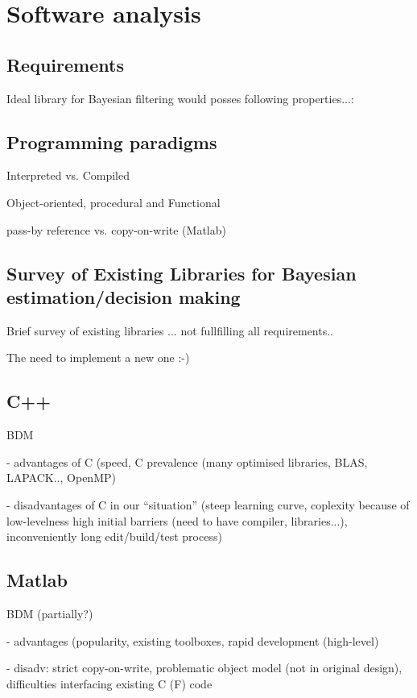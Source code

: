 \documentclass[a4paper,12pt,oneside]{report}
\begin{document}
\chapter{Software analysis}

\section{Requirements}

Ideal library for Bayesian filtering would posses following properties...:

\section{Programming paradigms}

Interpreted vs. Compiled

Object-oriented, procedural and Functional

pass-by reference vs. copy-on-write (Matlab)

\section{Survey of Existing Libraries for Bayesian estimation/decision making}

Brief survey of existing libraries ... not fullfilling all requirements..

The need to implement a new one :-)

\section{C++}

BDM

 - advantages of C (speed, C prevalence (many optimised libraries, BLAS, LAPACK.., OpenMP)

 - disadvantages of C in our ``situation'' (steep learning curve, coplexity because of low-levelness
   high initial barriers (need to have compiler, libraries...), inconveniently long edit/build/test
   process)

\section{Matlab}

BDM (partially?)

 - advantages (popularity, existing toolboxes, rapid development (high-level)

 - disadv: strict copy-on-write, problematic object model (not in original design), difficulties
           interfacing existing C (F) code
\end{document}
